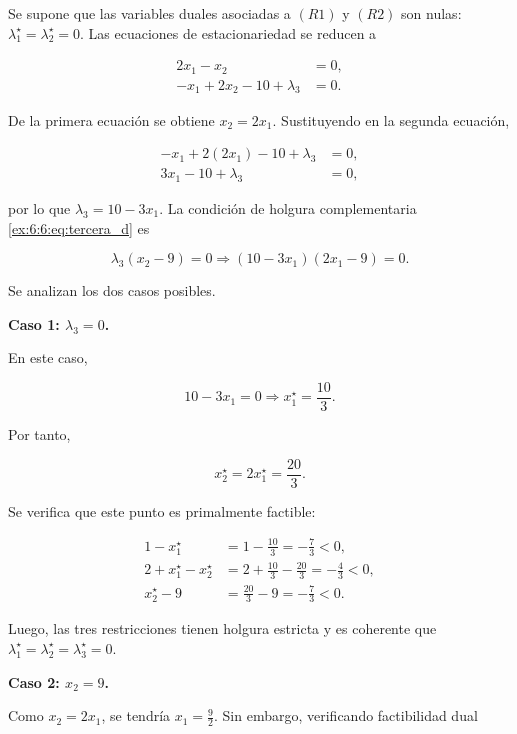 \begin{enumerate}
Se supone que las variables duales asociadas a \((R1)\) y \((R2)\) son nulas: $\lambda_1^\star=\lambda_2^\star=0$. Las ecuaciones de estacionariedad se reducen a

\begin{align}
2x_1-x_2
&=0,\\
-x_1+2x_2-10+\lambda_3
&=0.
\end{align}

De la primera ecuación se obtiene $x_2=2x_1.$ Sustituyendo en la segunda ecuación,

\begin{align}
-x_1+2(2x_1)-10+\lambda_3
&=0,\\
3x_1-10+\lambda_3
&=0,
\end{align}

por lo que $\lambda_3=10-3x_1.$ La condición de holgura complementaria \eqref{ex:6:6:eq:tercera_d} es

\begin{equation}
\lambda_3(x_2-9)=0
\Rightarrow (10-3x_1)(2x_1-9)=0.
\end{equation}

Se analizan los dos casos posibles.

\medskip\noindent\textbf{Caso 1: \(\lambda_3=0\).}

En este caso,

\begin{equation}
10-3x_1=0 \Rightarrow x_1^\star=\frac{10}{3}.
\end{equation}

Por tanto,

\begin{equation}
x_2^\star
=
2x_1^\star
=
\frac{20}{3}.
\end{equation}

Se verifica que este punto es primalmente factible:

\begin{align}
1-x_1^\star
&=
1-\frac{10}{3}
=
-\frac{7}{3}<0,\\
2+x_1^\star-x_2^\star
&=
2+\frac{10}{3}-\frac{20}{3}
=
-\frac{4}{3}<0,\\
x_2^\star-9
&=
\frac{20}{3}-9
=
-\frac{7}{3}<0.
\end{align}

Luego, las tres restricciones tienen holgura estricta y es coherente que $\lambda_1^\star=\lambda_2^\star=\lambda_3^\star
=0.$

\medskip\noindent\textbf{Caso 2: \(x_2=9\).}

Como \(x_2=2x_1\), se tendría $x_1=\frac{9}{2}.$ Sin embargo, verificando factibilidad dual


\end{enumerate}
